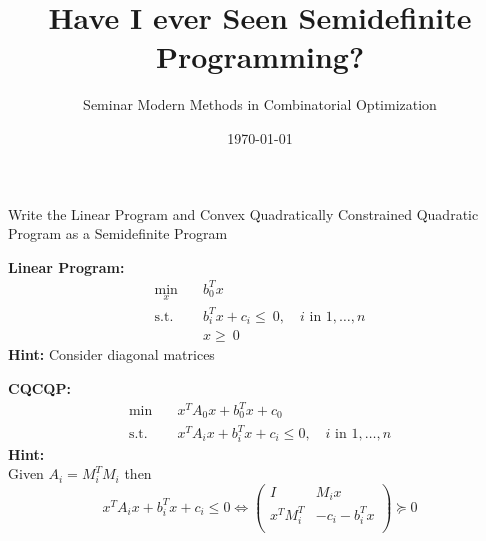 \documentclass[a4paper]{scrartcl}
\title{Have I ever Seen Semidefinite Programming?}
\subtitle{Seminar Modern Methods in Combinatorial Optimization}
\date{\today}
\theoremstyle{plain}
\begin{document}
	\maketitle
	\noindent
	Write the Linear Program and Convex Quadratically Constrained Quadratic Program as a Semidefinite Program
	\bigskip
	
	\textbf{Linear Program:}
	\begin{equation*}
		\begin{aligned}
			\min_x\quad & b_0^Tx\quad\\
			\text{s.t.}\quad & b_i^Tx+c_i\leq  \:0,\quad i\text{ in } 1,\dots,n\\
			&x\geq \:0
		\end{aligned}
	\end{equation*}
	\textbf{Hint:}
	Consider diagonal matrices
	\bigskip
	
	\textbf{CQCQP:}
	\begin{equation*}
	\begin{aligned}
	\min\quad &x^TA_0x+b_0^Tx+c_0\\
	\text{s.t.}\quad &x^TA_ix+b_i^Tx+c_i\leq 0,\quad i\text{ in }1,\dots ,n
	\end{aligned}
	\end{equation*}
	\textbf{Hint:}
	\\
	Given $A_i=M_i^TM_i$ then
	\begin{equation*}
	x^TA_ix+b_i^Tx+c_i\leq 0 \Leftrightarrow
	\begin{pmatrix}
	I & M_ix\\
	x^TM_i^T & -c_i-b_i^Tx\\
	\end{pmatrix}
	\succeq 0
	\end{equation*}
\end{document}
